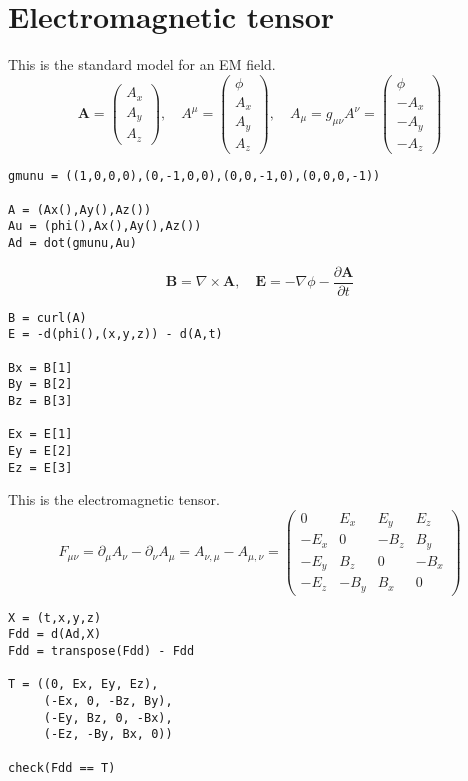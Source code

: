 \documentclass[12pt]{article}
\begin{document}
\section*{Electromagnetic tensor}

This is the standard model for an EM field.
\begin{equation*}
\mathbf A=\begin{pmatrix}A_x\\A_y\\A_z\end{pmatrix},\quad
A^\mu=\begin{pmatrix}\phi\\A_x\\A_y\\A_z\end{pmatrix},\quad
A_\mu=g_{\mu\nu}A^\nu=\begin{pmatrix}\phi\\-A_x\\-A_y\\-A_z\end{pmatrix}
\end{equation*}
{\footnotesize
\begin{verbatim}
gmunu = ((1,0,0,0),(0,-1,0,0),(0,0,-1,0),(0,0,0,-1))

A = (Ax(),Ay(),Az())
Au = (phi(),Ax(),Ay(),Az())
Ad = dot(gmunu,Au)
\end{verbatim}}

\begin{equation*}
\mathbf B=\nabla\times\mathbf A,\quad
\mathbf E=-\nabla\phi-\frac{\partial\mathbf A}{\partial t}
\end{equation*}
{\footnotesize
\begin{verbatim}
B = curl(A)
E = -d(phi(),(x,y,z)) - d(A,t)

Bx = B[1]
By = B[2]
Bz = B[3]

Ex = E[1]
Ey = E[2]
Ez = E[3]
\end{verbatim}}

This is the electromagnetic tensor.
\begin{equation*}
F_{\mu\nu}
=\partial_\mu A_\nu-\partial_\nu A_\mu
=A_{\nu,\mu}-A_{\mu,\nu}
=\begin{pmatrix}
0 & E_x & E_y & E_z
\\
-E_x & 0 & -B_z & B_y
\\
-E_y & B_z & 0 & -B_x
\\
-E_z & -B_y & B_x & 0
\end{pmatrix}
\end{equation*}
{\footnotesize
\begin{verbatim}
X = (t,x,y,z)
Fdd = d(Ad,X)
Fdd = transpose(Fdd) - Fdd

T = ((0, Ex, Ey, Ez),
     (-Ex, 0, -Bz, By),
     (-Ey, Bz, 0, -Bx),
     (-Ez, -By, Bx, 0))

check(Fdd == T)
\end{verbatim}}
\end{document}
